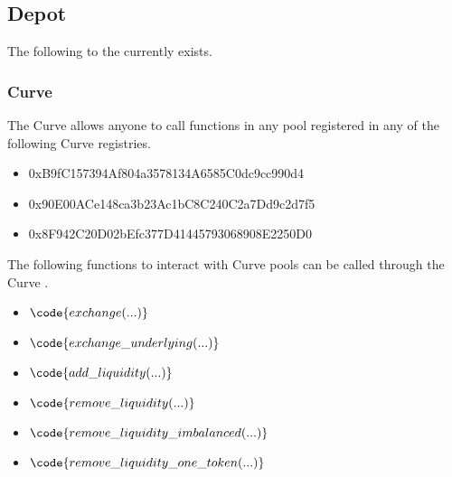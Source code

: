 \documentclass[class=article, crop=false]{standalone}
\begin{document}
\subsection{Depot}
The following  to the  currently exists.

\subsubsection{Curve}
The Curve  allows anyone to call functions in any pool registered in any of the following Curve registries.
\begin{itemize}
    \item 0xB9fC157394Af804a3578134A6585C0dc9cc990d4
    \item 0x90E00ACe148ca3b23Ac1bC8C240C2a7Dd9c2d7f5
    \item 0x8F942C20D02bEfc377D41445793068908E2250D0
\end{itemize}

The following functions to interact with Curve pools can be called through the Curve .
\begin{itemize}
    \item $\code{exchange(...)}$
    \item $\code{exchange\_underlying(...)}$
    \item $\code{add\_liquidity(...)}$
    \item $\code{remove\_liquidity(...)}$
    \item $\code{remove\_liquidity\_imbalanced(...)}$
    \item $\code{remove\_liquidity\_one\_token(...)}$
\end{itemize}
\end{document}
